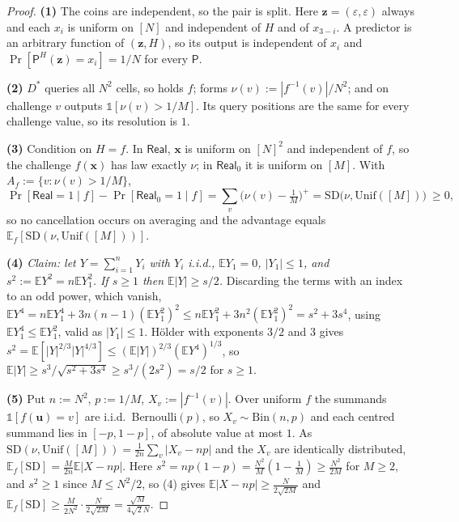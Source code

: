 \documentclass{aicr-solution}
\newcommand{\Real}{\mathsf{Real}}
\newcommand{\Prob}[1]{\Pr\!\left[#1\right]}
\newcommand{\Exp}{\mathbb{E}}
\newcommand{\vx}{\mathbf{x}}
\newcommand{\vz}{\mathbf{z}}
\newcommand{\vu}{\mathbf{u}}
\newcommand{\ind}{\mathbb{1}}
\newcommand{\Unif}{\mathrm{Unif}}
\newcommand{\SD}{\mathrm{SD}}
\begin{document}
\begin{proof}
\textbf{(1)} The coins are independent, so the pair is split. Here
$\vz = (\varepsilon,\varepsilon)$ always and each $x_i$ is uniform on $[N]$ and
independent of $H$ and of $x_{3-i}$. A predictor is an arbitrary function of
$(\vz,H)$, so its output is independent of $x_i$ and
$\Prob{\mathsf{P}^{H}(\vz) = x_i} = 1/N$ for every $\mathsf{P}$.

\textbf{(2)} $D^{*}$ queries all $N^{2}$ cells, so holds $f$; forms
$\nu(v) := |f^{-1}(v)|/N^{2}$; and on challenge $v$ outputs
$\ind[\nu(v) > 1/M]$. Its query positions are the same for every challenge value,
so its resolution is $1$.

\textbf{(3)} Condition on $H = f$. In $\Real$, $\vx$ is uniform on $[N]^{2}$ and
independent of $f$, so the challenge $f(\vx)$ has law exactly $\nu$; in $\Real_0$
it is uniform on $[M]$. With $A_f := \{v : \nu(v) > 1/M\}$,
\[
  \Prob{\Real = 1 \mid f} - \Prob{\Real_0 = 1 \mid f}
  = \sum_v \bigl(\nu(v) - \tfrac1M\bigr)^{+}
  = \SD\bigl(\nu, \Unif([M])\bigr) \ \ge 0,
\]
so no cancellation occurs on averaging and the advantage equals
$\Exp_f[\SD(\nu,\Unif([M]))]$.

\textbf{(4)} \emph{Claim: let $Y = \sum_{i=1}^{n} Y_i$ with $Y_i$ i.i.d.,
$\Exp Y_1 = 0$, $|Y_1| \le 1$, and $s^{2} := \Exp Y^{2} = n\Exp Y_1^{2}$. If
$s \ge 1$ then $\Exp|Y| \ge s/2$.} Discarding the terms with an index to an odd
power, which vanish,
$\Exp Y^{4} = n\Exp Y_1^{4} + 3n(n-1)(\Exp Y_1^{2})^{2}
\le n\Exp Y_1^{2} + 3n^{2}(\Exp Y_1^{2})^{2} = s^{2} + 3s^{4}$, using
$\Exp Y_1^{4} \le \Exp Y_1^{2}$, valid as $|Y_1| \le 1$. H\"older with exponents
$3/2$ and $3$ gives
$s^{2} = \Exp[|Y|^{2/3}|Y|^{4/3}] \le (\Exp|Y|)^{2/3}(\Exp Y^{4})^{1/3}$, so
$\Exp|Y| \ge s^{3}/\sqrt{s^{2}+3s^{4}} \ge s^{3}/(2s^{2}) = s/2$ for $s \ge 1$.

\textbf{(5)} Put $n := N^{2}$, $p := 1/M$, $X_v := |f^{-1}(v)|$. Over uniform $f$
the summands $\ind[f(\vu) = v]$ are i.i.d.\ Bernoulli$(p)$, so
$X_v \sim \mathrm{Bin}(n,p)$ and each centred summand lies in $[-p,1-p]$, of
absolute value at most $1$. As
$\SD(\nu,\Unif([M])) = \frac{1}{2n}\sum_v |X_v - np|$ and the $X_v$ are
identically distributed, $\Exp_f[\SD] = \frac{M}{2n}\Exp|X - np|$. Here
$s^{2} = np(1-p) = \frac{N^{2}}{M}(1 - \frac1M) \ge \frac{N^{2}}{2M}$ for
$M \ge 2$, and $s^{2} \ge 1$ since $M \le N^{2}/2$, so (4) gives
$\Exp|X - np| \ge \frac{N}{2\sqrt{2M}}$ and
$\Exp_f[\SD] \ge \frac{M}{2N^{2}} \cdot \frac{N}{2\sqrt{2M}}
= \frac{\sqrt{M}}{4\sqrt2 N}$.
\end{proof}
\end{document}
